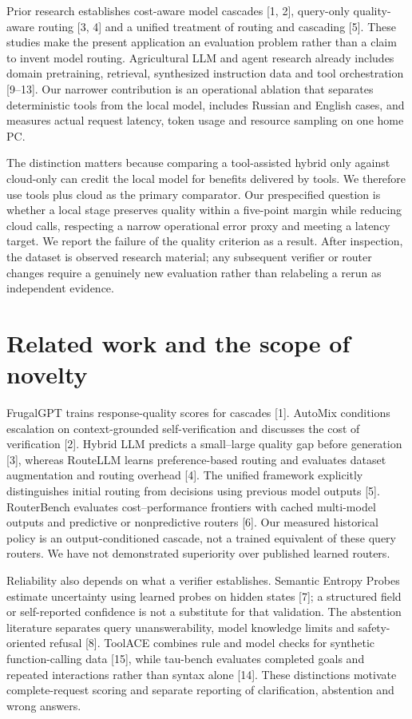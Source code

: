 \documentclass[10pt,a4paper,twocolumn]{article}
\begin{document}
Prior research establishes cost-aware model cascades [1, 2], query-only quality-aware routing [3, 4] and a unified treatment of routing and cascading [5]. These studies make the present application an evaluation problem rather than a claim to invent model routing. Agricultural LLM and agent research already includes domain pretraining, retrieval, synthesized instruction data and tool orchestration [9--13]. Our narrower contribution is an operational ablation that separates deterministic tools from the local model, includes Russian and English cases, and measures actual request latency, token usage and resource sampling on one home PC.

The distinction matters because comparing a tool-assisted hybrid only against cloud-only can credit the local model for benefits delivered by tools. We therefore use tools plus cloud as the primary comparator. Our prespecified question is whether a local stage preserves quality within a five-point margin while reducing cloud calls, respecting a narrow operational error proxy and meeting a latency target. We report the failure of the quality criterion as a result. After inspection, the dataset is observed research material; any subsequent verifier or router changes require a genuinely new evaluation rather than relabeling a rerun as independent evidence.

\section{Related work and the scope of novelty}

FrugalGPT trains response-quality scores for cascades [1]. AutoMix conditions escalation on context-grounded self-verification and discusses the cost of verification [2]. Hybrid LLM predicts a small--large quality gap before generation [3], whereas RouteLLM learns preference-based routing and evaluates dataset augmentation and routing overhead [4]. The unified framework explicitly distinguishes initial routing from decisions using previous model outputs [5]. RouterBench evaluates cost--performance frontiers with cached multi-model outputs and predictive or nonpredictive routers [6]. Our measured historical policy is an output-conditioned cascade, not a trained equivalent of these query routers. We have not demonstrated superiority over published learned routers.

Reliability also depends on what a verifier establishes. Semantic Entropy Probes estimate uncertainty using learned probes on hidden states [7]; a structured field or self-reported confidence is not a substitute for that validation. The abstention literature separates query unanswerability, model knowledge limits and safety-oriented refusal [8]. ToolACE combines rule and model checks for synthetic function-calling data [15], while tau-bench evaluates completed goals and repeated interactions rather than syntax alone [14]. These distinctions motivate complete-request scoring and separate reporting of clarification, abstention and wrong answers.
\end{document}
